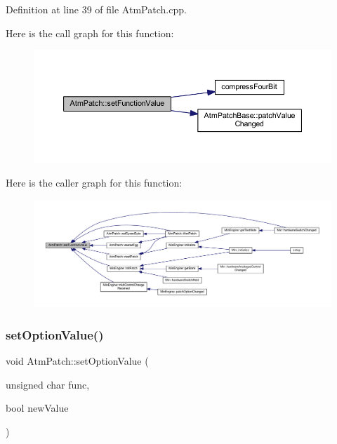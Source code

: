 Definition at line 39 of file Atm\+Patch.\+cpp.

Here is the call graph for this function\+:
\nopagebreak
\begin{figure}[H]
\begin{center}
\leavevmode
\includegraphics[width=350pt]{d9/de1/class_atm_patch_ad2fe7a265755afc95a36752b86b6a7e2_cgraph}
\end{center}
\end{figure}
Here is the caller graph for this function\+:
\nopagebreak
\begin{figure}[H]
\begin{center}
\leavevmode
\includegraphics[width=350pt]{d9/de1/class_atm_patch_ad2fe7a265755afc95a36752b86b6a7e2_icgraph}
\end{center}
\end{figure}
\mbox{\label{class_atm_patch_a1139606bcbffe63881b3f175f577d8e1}} 
\subsubsection{\texorpdfstring{set\+Option\+Value()}{setOptionValue()}}
{\footnotesize\ttfamily void Atm\+Patch\+::set\+Option\+Value (\begin{DoxyParamCaption}\item[{unsigned char}]{func,  }\item[{bool}]{new\+Value }\end{DoxyParamCaption})}



